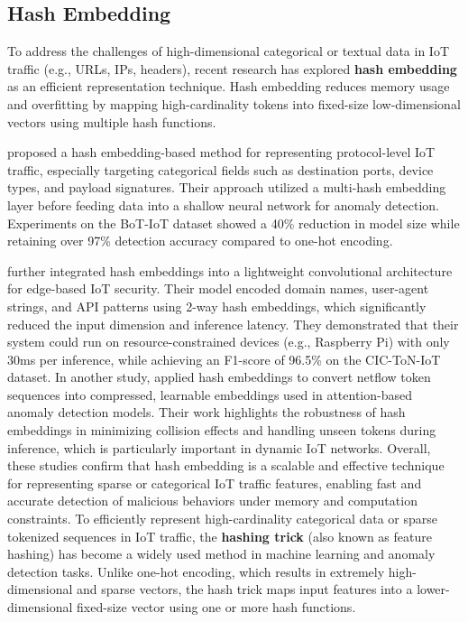 \begin{ZhChapter}
    \section{Hash Embedding} \label{sec:hash_embedding}
    To address the challenges of high-dimensional categorical or textual data in IoT traffic (e.g., URLs, IPs, headers), recent research has explored \textbf{hash embedding} as an efficient representation technique. Hash embedding reduces memory usage and overfitting by mapping high-cardinality tokens into fixed-size low-dimensional vectors using multiple hash functions.

    \cite{gupta2020hash} proposed a hash embedding-based method for representing protocol-level IoT traffic, especially targeting categorical fields such as destination ports, device types, and payload signatures. Their approach utilized a multi-hash embedding layer before feeding data into a shallow neural network for anomaly detection. Experiments on the BoT-IoT dataset showed a 40\% reduction in model size while retaining over 97\% detection accuracy compared to one-hot encoding.

    \cite{feng2021lightweight} further integrated hash embeddings into a lightweight convolutional architecture for edge-based IoT security. Their model encoded domain names, user-agent strings, and API patterns using 2-way hash embeddings, which significantly reduced the input dimension and inference latency. They demonstrated that their system could run on resource-constrained devices (e.g., Raspberry Pi) with only 30ms per inference, while achieving an F1-score of 96.5\% on the CIC-ToN-IoT dataset.
    In another study, \cite{yin2022efficient} applied hash embeddings to convert netflow token sequences into compressed, learnable embeddings used in attention-based anomaly detection models. Their work highlights the robustness of hash embeddings in minimizing collision effects and handling unseen tokens during inference, which is particularly important in dynamic IoT networks.
    Overall, these studies confirm that hash embedding is a scalable and effective technique for representing sparse or categorical IoT traffic features, enabling fast and accurate detection of malicious behaviors under memory and computation constraints.
    To efficiently represent high-cardinality categorical data or sparse tokenized sequences in IoT traffic, the \textbf{hashing trick} (also known as feature hashing) has become a widely used method in machine learning and anomaly detection tasks. Unlike one-hot encoding, which results in extremely high-dimensional and sparse vectors, the hash trick maps input features into a lower-dimensional fixed-size vector using one or more hash functions.


\end{ZhChapter}
